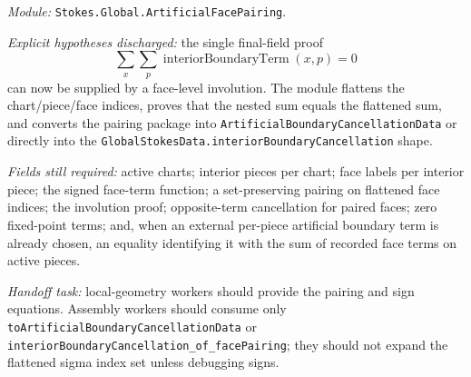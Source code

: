 \begin{definition}
  \label{anc:m6_artificial_face_pairing}
  \leanok
  \emph{Module:} \texttt{Stokes.Global.ArtificialFacePairing}.

  \emph{Explicit hypotheses discharged:}
  the single final-field proof
  \[
    \sum_x \sum_p \operatorname{interiorBoundaryTerm}(x,p)=0
  \]
  can now be supplied by a face-level involution.  The module flattens the
  chart/piece/face indices, proves that the nested sum equals the flattened
  sum, and converts the pairing package into
  \texttt{ArtificialBoundaryCancellationData} or directly into the
  \texttt{GlobalStokesData.interiorBoundaryCancellation} shape.

  \emph{Fields still required:}
  active charts; interior pieces per chart; face labels per interior piece; the
  signed face-term function; a set-preserving pairing on flattened face
  indices; the involution proof; opposite-term cancellation for paired faces;
  zero fixed-point terms; and, when an external per-piece artificial boundary
  term is already chosen, an equality identifying it with the sum of recorded
  face terms on active pieces.

  \emph{Handoff task:}
  local-geometry workers should provide the pairing and sign equations.
  Assembly workers should consume only
  \texttt{toArtificialBoundaryCancellationData} or
  \texttt{interiorBoundaryCancellation\_of\_facePairing}; they should not expand
  the flattened sigma index set unless debugging signs.
\end{definition}

